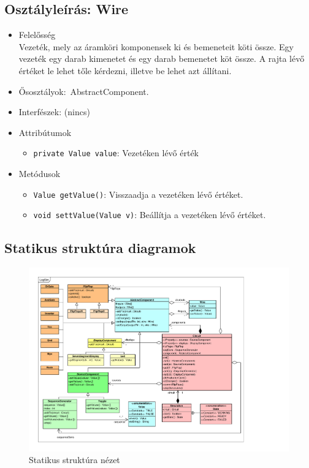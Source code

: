 \subsection{Osztályleírás: \bf Wire}
\begin{itemize}
\item Felelősség\\
Vezeték, mely az áramköri komponensek ki és bemeneteit köti össze. Egy vezeték egy darab kimenetet és egy darab bemenetet köt össze. A rajta lévő értéket le lehet tőle kérdezni, illetve be lehet azt állítani.
\item Ősosztályok:\ AbstractComponent.
\item Interfészek: (nincs)
\item Attribútumok $\ $
\begin{itemize}
	\item \texttt{private Value value}: Vezetéken lévő érték
\end{itemize}
\item Metódusok$\ $
\begin{itemize}
	\item \texttt{Value getValue()}: Visszaadja a vezetéken lévő értéket.
	\item \texttt{void settValue(Value v)}: Beállítja a vezetéken lévő értéket.
\end{itemize}
\end{itemize}

\subsection{Statikus struktúra diagramok}

\begin{figure}[H]
\begin{center}
\includegraphics*[angle=90, width=17cm, viewport = 25 30 705 565]{chapters/chapter04/classdiagram/class.pdf}
\caption{Statikus struktúra nézet}
\label{fig:class_diagram}
\end{center}
\end{figure}

